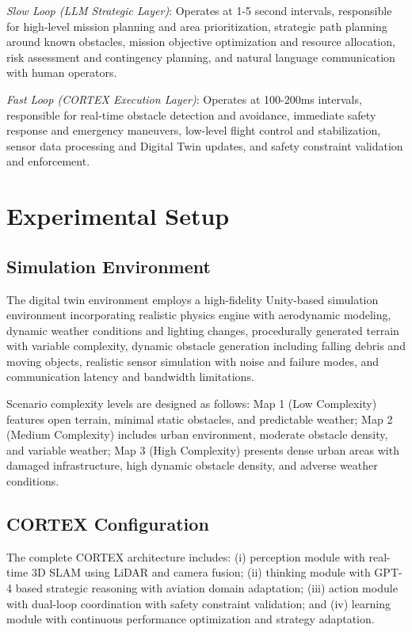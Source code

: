 \emph{Slow Loop (LLM Strategic Layer)}: Operates at 1-5 second intervals, responsible for high-level mission planning and area prioritization, strategic path planning around known obstacles, mission objective optimization and resource allocation, risk assessment and contingency planning, and natural language communication with human operators.

\emph{Fast Loop (CORTEX Execution Layer)}: Operates at 100-200ms intervals, responsible for real-time obstacle detection and avoidance, immediate safety response and emergency maneuvers, low-level flight control and stabilization, sensor data processing and Digital Twin updates, and safety constraint validation and enforcement.

\section{Experimental Setup}

\subsection{Simulation Environment}

The digital twin environment employs a high-fidelity Unity-based simulation environment incorporating realistic physics engine with aerodynamic modeling, dynamic weather conditions and lighting changes, procedurally generated terrain with variable complexity, dynamic obstacle generation including falling debris and moving objects, realistic sensor simulation with noise and failure modes, and communication latency and bandwidth limitations.

Scenario complexity levels are designed as follows: Map 1 (Low Complexity) features open terrain, minimal static obstacles, and predictable weather; Map 2 (Medium Complexity) includes urban environment, moderate obstacle density, and variable weather; Map 3 (High Complexity) presents dense urban areas with damaged infrastructure, high dynamic obstacle density, and adverse weather conditions.

\subsection{CORTEX Configuration}

The complete CORTEX architecture includes: (i) perception module with real-time 3D SLAM using LiDAR and camera fusion; (ii) thinking module with GPT-4 based strategic reasoning with aviation domain adaptation; (iii) action module with dual-loop coordination with safety constraint validation; and (iv) learning module with continuous performance optimization and strategy adaptation.

